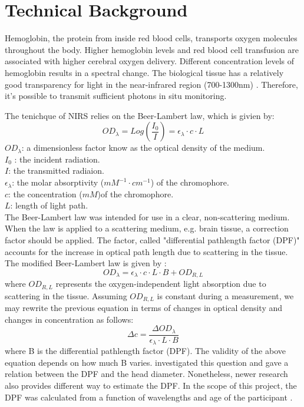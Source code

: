 \section{Technical Background}
Hemoglobin, the protein from inside red blood cells, transports oxygen molecules throughout the body. Higher hemoglobin levels and red blood cell transfusion are associated with higher cerebral oxygen delivery. Different concentration levels of hemoglobin results in a spectral change. The biological tissue has a relatively good transparency for light in the near-infrared region (700-1300nm) \cite{doi:10.1126/science.929199}. Therefore, it's possible to transmit sufficient photons in situ monitoring. 

The tenichque of NIRS relies on the Beer-Lambert law, which is givien by:
\[
OD_{\lambda} = Log(\frac {I_0}{I}) = \epsilon _{\lambda} \cdot c \cdot L
\]
$OD_{\lambda} $: a dimensionless factor know as the optical density of the medium.  \\
$I_0$ : the incident radiation. \\
$I$: the transmitted radiaion. \\
$\epsilon _{\lambda}$: the molar absorptivity ($mM^{-1} \cdot cm^{-1}$) of the chromophore. \\
$c$: the concentration ($mM$)of the chromophore. \\
$L$: length of light path. \\

The Beer-Lambert law was intended for use in a clear, non-scattering medium. When the law is applied to a scattering medium, e.g. brain tissue, a correction factor should be applied. The factor, called "differential pathlength factor (DPF)" accounts for the increase in optical path length due to scattering in the tissue. The modified Beer-Lambert law is given by \cite {Delpy_1988}:
\[
OD_{\lambda} = \epsilon _{\lambda} \cdot c \cdot L \cdot B + OD_{R,L}
\]
where $OD_{R,L}$ represents the oxygen-independent light absorption due to scattering in the tissue. Assuming $OD_{R,L}$ is constant during a measurement, we may rewrite the previous equation in terms of changes in optical density and changes in concentration as follows:
\[
\Delta c =\frac { \Delta OD_{\lambda}} {\epsilon _{\lambda} \cdot L \cdot B}
\]
where B is the differential pathlength factor (DPF). The validity of the above equation depends on how much B varies. \cite {Delpy_1988} investigated this question and gave a relation between the DPF and the head diameter. Nonetheless, newer research also provides different way to estimate the DPF. In the scope of this project, the DPF was calculated from a function of wavelengths and age of the participant \cite {Duncan1996MeasurementOC}.







